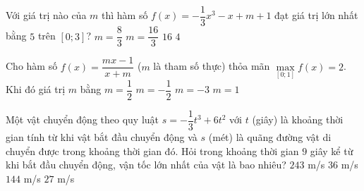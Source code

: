 \begin{ex}%
    Với giá trị nào của $m$ thì hàm số $f(x)= - \dfrac{1}{3} x^3 -x + m +1$ đạt giá trị lớn nhất bằng $5$ trên $[0;3]$?
    \choice
    {$m= \dfrac{8}{3}$}
    {$ m= \dfrac{16}{3} $}
    {$ 16$}
    {\True $ 4$}
\end{ex}
\begin{ex}%
    Cho hàm số $ f(x)=\dfrac{mx-1}{x+m} $ ($ m $ là tham số thực) thỏa mãn $ \max\limits_{[0 ; 1]} f(x)=2 $. Khi đó giá trị $ m $ bằng
    \choice
    {$m=\dfrac{1}{2}$}
    {$m=-\dfrac{1}{2}$}
    {\True$m=-3$}
    {$m=1$}
\end{ex}
\begin{ex}%
    Một vật chuyển động theo quy luật $s=-\dfrac{1}{3}t^3+6t^2$ với $t$ (giây) là khoảng thời gian tính từ khi vật bắt đầu chuyển động và $s$ (mét) là quãng đường vật di chuyển được trong khoảng thời gian đó. Hỏi trong khoảng thời gian $9$ giây kể từ khi bắt đầu chuyển động, vận tốc lớn nhất của vật là bao nhiêu?
    \choice
    {$243$ m/s}
    {\True $36$ m/s}
    {$144$ m/s}
    {$27$ m/s}
\end{ex}
